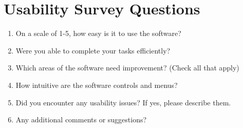 \documentclass[12pt, titlepage]{article}
\begin{document}
\newpage

\section{Usability Survey Questions} \label{Survey}

\begin{enumerate}
  \item On a scale of 1-5, how easy is it to use the software?
  
  \item Were you able to complete your tasks efficiently?
  
  \item Which areas of the software need improvement? (Check all that apply)

  \item How intuitive are the software controls and menus?

  \item Did you encounter any usability issues? If yes, please describe them.\\
  \underline{\hspace{12cm}}
  
  \item Any additional comments or suggestions?\\
  \underline{\hspace{12cm}}
\end{enumerate}
\end{document}
